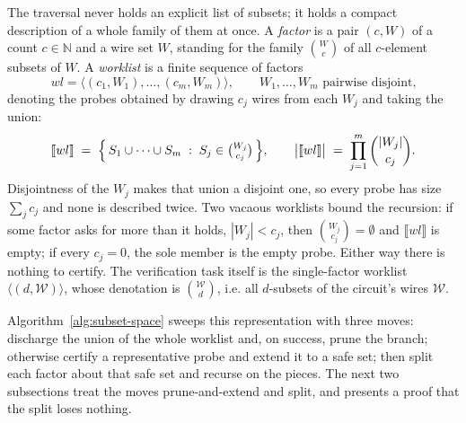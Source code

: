   The traversal never holds an explicit list of subsets; it holds a compact
  description of a whole family of them at once. A \emph{factor} is a pair
  $(c, W)$ of a count $c \in \mathbb{N}$ and a wire set $W$, standing for the
  family $\binom{W}{c}$ of all $c$-element subsets of $W$. A \emph{worklist} is a
  finite sequence of factors
  \[
    wl = \big\langle (c_1, W_1), \dots, (c_m, W_m) \big\rangle,
    \qquad W_1, \dots, W_m \text{ pairwise disjoint,}
  \]
  denoting the probes obtained by drawing $c_j$ wires from each $W_j$ and taking
  the union:
  \[
    \llbracket wl \rrbracket \;=\;
      \Big\{\, S_1 \cup \dots \cup S_m \;:\; S_j \in \tbinom{W_j}{c_j} \,\Big\},
    \qquad
    \big|\llbracket wl \rrbracket\big| \;=\; \prod_{j=1}^{m} \binom{|W_j|}{c_j}.
  \]
  Disjointness of the $W_j$ makes that union a disjoint one, so every probe has
  size $\sum_j c_j$ and none is described twice. Two vacaous worklists bound
  the recursion: if some factor asks for more than it holds, $|W_j| < c_j$, then
  $\binom{W_j}{c_j} = \emptyset$ and $\llbracket wl \rrbracket$ is empty; if every
  $c_j = 0$, the sole member is the empty probe. Either way there is nothing to
  certify. The verification task itself is the single-factor worklist
  $\big\langle (d, \mathcal{W}) \big\rangle$, whose denotation is
  $\binom{\mathcal{W}}{d}$, i.e. all $d$-subsets of the circuit's wires
  $\mathcal{W}$.

  Algorithm~\ref{alg:subset-space} sweeps this representation with three moves:
  discharge the union of the whole worklist and, on success, prune the branch;
  otherwise certify a representative probe and extend it to a safe set; then split
  each factor about that safe set and recurse on the pieces. The next two
  subsections treat the moves prune-and-extend and split, and presents a proof
  that the split loses nothing.

